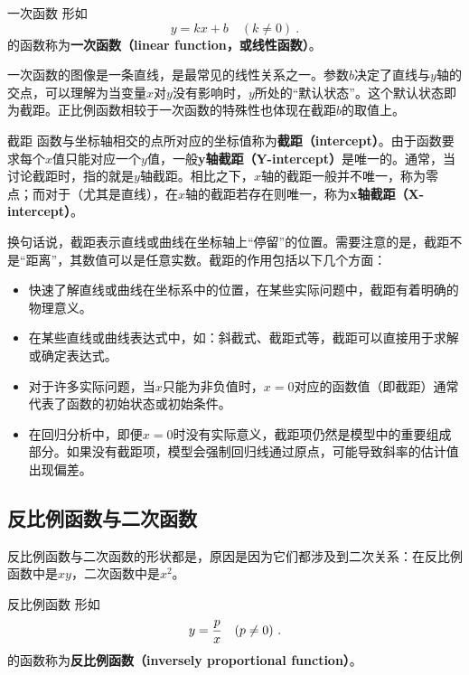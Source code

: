 \begin{definition}{一次函数}
形如
\begin{equation}
y = kx+b\quad(k\neq0)~.
\end{equation}
的函数称为\textbf{一次函数（linear function，或线性函数）}。
\end{definition}

一次函数的图像是一条直线，是最常见的线性关系之一。参数$b$决定了直线与$y$轴的交点，可以理解为当变量$x$对$y$没有影响时，$y$所处的“默认状态”。这个默认状态即为截距。正比例函数相较于一次函数的特殊性也体现在截距$b$的取值上。

\begin{definition}{截距}
函数与坐标轴相交的点所对应的坐标值称为\textbf{截距（intercept）}。由于函数要求每个$x$值只能对应一个$y$值，一般\textbf{y轴截距（Y-intercept）}是唯一的。通常，当讨论截距时，指的就是$y$轴截距。相比之下，$x$轴的截距一般并不唯一，称为零点；而对于（尤其是直线），在$x$轴的截距若存在则唯一，称为\textbf{x轴截距（X-intercept）}。
\end{definition}

换句话说，截距表示直线或曲线在坐标轴上“停留”的位置。需要注意的是，截距不是“距离”，其数值可以是任意实数。截距的作用包括以下几个方面：
\begin{itemize}
\item 快速了解直线或曲线在坐标系中的位置，在某些实际问题中，截距有着明确的物理意义。
\item 在某些直线或曲线表达式中，如：斜截式、截距式等，截距可以直接用于求解或确定表达式。
\item 对于许多实际问题，当$x$只能为非负值时，$x=0$对应的函数值（即截距）通常代表了函数的初始状态或初始条件。
\item 在回归分析中，即便$x=0$时没有实际意义，截距项仍然是模型中的重要组成部分。如果没有截距项，模型会强制回归线通过原点，可能导致斜率的估计值出现偏差。
\end{itemize}

\subsection{反比例函数与二次函数}

反比例函数与二次函数的形状都是，原因是因为它们都涉及到二次关系：在反比例函数中是$xy$，二次函数中是$x^2$。

\begin{definition}{反比例函数}
形如
\begin{equation}
y={p\over x}\quad(p\neq0)~.
\end{equation}
的函数称为\textbf{反比例函数（inversely proportional function）}。
\end{definition}

